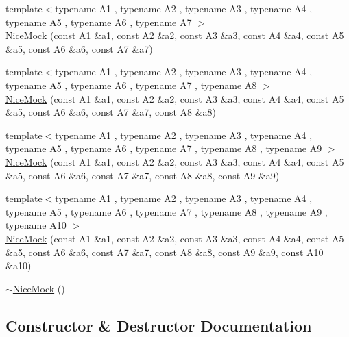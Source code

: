 \begin{DoxyCompactItemize}
\item 
{\footnotesize template$<$typename A1 , typename A2 , typename A3 , typename A4 , typename A5 , typename A6 , typename A7 $>$ }\\\mbox{\hyperlink{classtesting_1_1NiceMock_a946d75ece1fa3a066b7d9d6ab7828c55}{Nice\+Mock}} (const A1 \&a1, const A2 \&a2, const A3 \&a3, const A4 \&a4, const A5 \&a5, const A6 \&a6, const A7 \&a7)
\item 
{\footnotesize template$<$typename A1 , typename A2 , typename A3 , typename A4 , typename A5 , typename A6 , typename A7 , typename A8 $>$ }\\\mbox{\hyperlink{classtesting_1_1NiceMock_ae8792aab6c024a50886856bf1093eedc}{Nice\+Mock}} (const A1 \&a1, const A2 \&a2, const A3 \&a3, const A4 \&a4, const A5 \&a5, const A6 \&a6, const A7 \&a7, const A8 \&a8)
\item 
{\footnotesize template$<$typename A1 , typename A2 , typename A3 , typename A4 , typename A5 , typename A6 , typename A7 , typename A8 , typename A9 $>$ }\\\mbox{\hyperlink{classtesting_1_1NiceMock_a61cfc9282222928590bcdaf851a806c6}{Nice\+Mock}} (const A1 \&a1, const A2 \&a2, const A3 \&a3, const A4 \&a4, const A5 \&a5, const A6 \&a6, const A7 \&a7, const A8 \&a8, const A9 \&a9)
\item 
{\footnotesize template$<$typename A1 , typename A2 , typename A3 , typename A4 , typename A5 , typename A6 , typename A7 , typename A8 , typename A9 , typename A10 $>$ }\\\mbox{\hyperlink{classtesting_1_1NiceMock_a4baf1da52f4c892fc02f6ba10c0b8c02}{Nice\+Mock}} (const A1 \&a1, const A2 \&a2, const A3 \&a3, const A4 \&a4, const A5 \&a5, const A6 \&a6, const A7 \&a7, const A8 \&a8, const A9 \&a9, const A10 \&a10)
\item 
\mbox{\hyperlink{classtesting_1_1NiceMock_a30be5e5e20248f31c8390cd88fa74d7f}{$\sim$\+Nice\+Mock}} ()
\end{DoxyCompactItemize}


\subsection{Constructor \& Destructor Documentation}
\mbox{\label{classtesting_1_1NiceMock_a10bbd6ebe779ac8ab1f9f3ae2dee9310}} 
